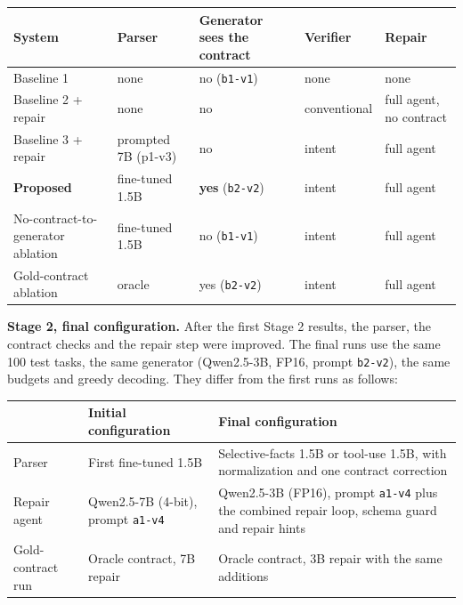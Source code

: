\documentclass[11pt]{article}
\begin{document}
\begin{table}[!tp]
\centering\footnotesize\setlength{\tabcolsep}{3pt}\renewcommand{\arraystretch}{1.1}
\begin{tabularx}{\textwidth}{>{\raggedright\arraybackslash}Xllll}
\toprule
\textbf{System} & \textbf{Parser} & \textbf{Generator sees the contract} & \textbf{Verifier} & \textbf{Repair} \\
\midrule
Baseline 1 & none & no (\texttt{b1-v1}) & none & none \\
Baseline 2 + repair & none & no & conventional & full agent, no contract \\
Baseline 3 + repair & prompted 7B (p1-v3) & no & intent & full agent \\
\textbf{Proposed} & fine-tuned 1.5B & \textbf{yes} (\texttt{b2-v2}) & intent & full agent \\
No-contract-to-generator ablation & fine-tuned 1.5B & no (\texttt{b1-v1}) & intent & full agent \\
Gold-contract ablation & oracle & yes (\texttt{b2-v2}) & intent & full agent \\
\bottomrule
\end{tabularx}
\end{table}

\textbf{Stage 2, final configuration.} After the first Stage 2 results,
the parser, the contract checks and the repair step were improved. The
final runs use the same 100 test tasks, the same generator (Qwen2.5-3B,
FP16, prompt \texttt{b2-v2}), the same budgets and greedy decoding. They
differ from the first runs as follows:

\begin{table}[!tp]
\centering\footnotesize\setlength{\tabcolsep}{3pt}\renewcommand{\arraystretch}{1.1}
\begin{tabularx}{\textwidth}{ll>{\raggedright\arraybackslash}X}
\toprule
\textbf{} & \textbf{Initial configuration} & \textbf{Final configuration} \\
\midrule
Parser & First fine-tuned 1.5B & Selective-facts 1.5B or tool-use 1.5B, with normalization and one contract correction \\
Repair agent & Qwen2.5-7B (4-bit), prompt \texttt{a1-v4} & Qwen2.5-3B (FP16), prompt \texttt{a1-v4} plus the combined repair loop, schema guard and repair hints \\
Gold-contract run & Oracle contract, 7B repair & Oracle contract, 3B repair with the same additions \\
\bottomrule
\end{tabularx}
\end{table}
\end{document}
